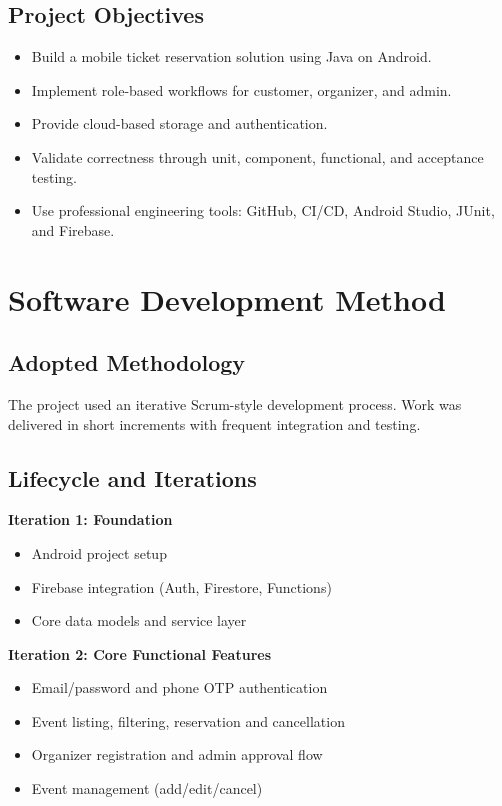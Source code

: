 \documentclass[12pt,a4paper]{article}
\begin{document}
\subsection{Project Objectives}

\begin{itemize}
    \item Build a mobile ticket reservation solution using Java on Android.
    \item Implement role-based workflows for customer, organizer, and admin.
    \item Provide cloud-based storage and authentication.
    \item Validate correctness through unit, component, functional, and acceptance testing.
    \item Use professional engineering tools: GitHub, CI/CD, Android Studio, JUnit, and Firebase.
\end{itemize}

\section{Software Development Method}

\subsection{Adopted Methodology}

The project used an iterative Scrum-style development process. Work was delivered in short increments with frequent integration and testing.

\subsection{Lifecycle and Iterations}

\textbf{Iteration 1: Foundation}
\begin{itemize}
    \item Android project setup
    \item Firebase integration (Auth, Firestore, Functions)
    \item Core data models and service layer
\end{itemize}

\textbf{Iteration 2: Core Functional Features}
\begin{itemize}
    \item Email/password and phone OTP authentication
    \item Event listing, filtering, reservation and cancellation
    \item Organizer registration and admin approval flow
    \item Event management (add/edit/cancel)
\end{itemize}
\end{document}
